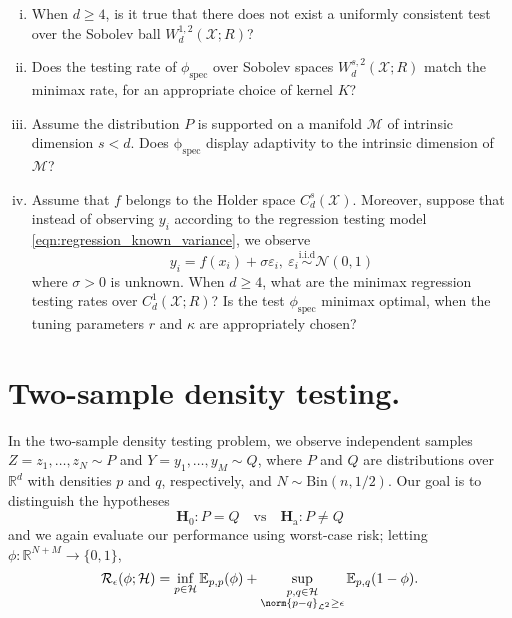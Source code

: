 \documentclass{article}
\newcommand{\Reals}{\mathbb{R}}
\newcommand{\1}{\mathbf{1}}
\newcommand{\Leb}{\mathcal{L}}
\newcommand{\Ebb}{\mathbb{E}}
\theoremstyle{alden}
\theoremstyle{aldenthm}
\theoremstyle{definition}
\theoremstyle{remark}
\begin{document}
\begin{enumerate}[(i)]
	\item When $d \geq 4$, is it true that there does not exist a uniformly consistent
	test over the Sobolev ball $W_d^{1,2}(\mathcal{X};R)$?
	\item Does the testing rate of $\phi_{\mathrm{spec}}$ over Sobolev spaces $W_d^{s,2}(\mathcal{X};R)$ match the minimax rate, for an appropriate choice of kernel $K$?
	\item Assume the distribution $P$ is supported on a manifold $\mathcal{M}$ of intrinsic dimension $s < d$. Does $\mathrm{\phi_{\mathrm{spec}}}$ display adaptivity to the intrinsic dimension of $\mathcal{M}$?
	\item Assume that $f$ belongs to the Holder space $C_d^s(\mathcal{X})$. Moreover, suppose that instead of observing ${y_i}$ according to the regression testing model \eqref{eqn:regression_known_variance}, we observe
	\begin{equation*}
	y_i = f(x_i) + \sigma \varepsilon_i, ~\varepsilon_i \overset{\textrm{i.i.d}}{\sim} \mathcal{N}(0,1)
	\end{equation*}
	where $\sigma > 0$ is unknown. When $d \geq 4$, what are the minimax regression testing rates over $C_d^1(\mathcal{X};R)$? Is the test $\phi_{\mathrm{spec}}$ minimax optimal, when the tuning parameters $r$ and $\kappa$ are appropriately chosen?
\end{enumerate}

\section{Two-sample density testing.}
In the two-sample density testing problem, we observe independent samples $Z = z_1,\ldots,z_N \sim P$ and $Y = y_1,\ldots,y_M \sim Q$, where $P$ and $Q$ are distributions over $\Reals^d$ with densities $p$ and $q$, respectively, and $N \sim \textrm{Bin}(n,1/2)$. Our goal is to distinguish the hypotheses
\begin{equation*}
\mathbf{H}_0: P = Q \quad \textrm{vs} \quad \mathbf{H}_{\textrm{a}}: P \neq Q
\end{equation*}
and we again evaluate our performance using worst-case risk; letting $\phi:\Reals^{N + M} \to \{0,1\}$, 
\begin{equation*}
\mathcal{R}_{\epsilon}(\phi; \mathcal{H}) = \inf_{p \in \mathcal{H}}\Ebb_{p,p}(\phi) + \sup_{\substack{p,q \in \mathcal{H} \\ \norm{p - q}_{\Leb^2} \geq \epsilon}} \Ebb_{p,q}(1 - \phi).
\end{equation*}
\end{document}
